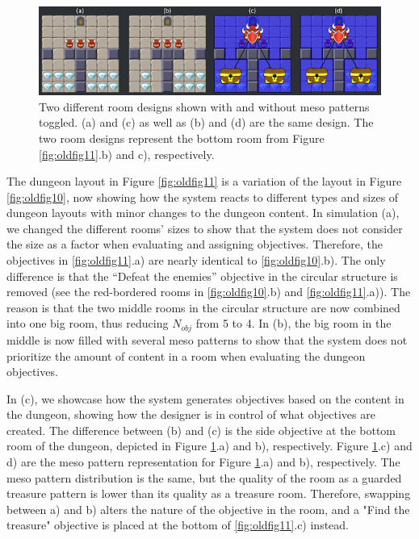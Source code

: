 \begin{figure}[h]
  \centering
  \includegraphics[width=\columnwidth]{included-papers-tex/paper-7/Figures/results8.png}
  \caption{Two different room designs shown with and without meso patterns toggled. (a) and (c) as well as (b) and (d) are the same design. The two room designs represent the bottom room from Figure \ref{fig:oldfig11}.b) and c), respectively.}
  \label{fig:oldfig12}
\end{figure}

The dungeon layout in Figure \ref{fig:oldfig11} is a variation of the layout in Figure \ref{fig:oldfig10}, now showing how the system reacts to different types and sizes of dungeon layouts with minor changes to the dungeon content. In simulation (a), we changed the different rooms' sizes to show that the system does not consider the size as a factor when evaluating and assigning objectives. Therefore, the objectives in \ref{fig:oldfig11}.a) are nearly identical to \ref{fig:oldfig10}.b). The only difference is that the “Defeat the enemies” objective in the circular structure is removed (see the red-bordered rooms in \ref{fig:oldfig10}.b) and \ref{fig:oldfig11}.a)). The reason is that the two middle rooms in the circular structure are now combined into one big room, thus reducing $N_{obj}$ from 5 to 4. In (b), the big room in the middle is now filled with several meso patterns to show that the system does not prioritize the amount of content in a room when evaluating the dungeon objectives. 

In (c), we showcase how the system generates objectives based on the content in the dungeon, showing how the designer is in control of what objectives are created. The difference between (b) and (c) is the side objective at the bottom room of the dungeon, depicted in Figure \ref{fig:oldfig12}.a) and b), respectively. Figure \ref{fig:oldfig12}.c) and d) are the meso pattern representation for Figure \ref{fig:oldfig12}.a) and b), respectively. The meso pattern distribution is the same, but the quality of the room as a guarded treasure pattern is lower than its quality as a treasure room. Therefore, swapping between a) and b) alters the nature of the objective in the room, and a "Find the treasure" objective is placed at the bottom of \ref{fig:oldfig11}.c) instead. 

